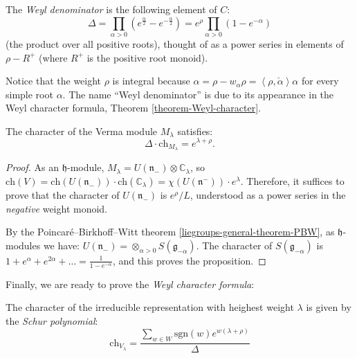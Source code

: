 \begin{definition}
 \label{definition-Weyl-denominator}
The {\it Weyl denominator} is the following element of $C$: 
$$\Delta = \prod_{\alpha>0} \left( e^\frac{\alpha}{2} - e^{-\frac{\alpha}{2}}\right) =  e^\rho \prod_{\alpha>0} \left( 1 - e^{-{\alpha}}\right)$$
(the product over all positive roots), thought of as a power series in elements of $\rho-R^+$ (where $R^+$ is the positive root monoid).
\end{definition}

Notice that the weight $\rho$ is integral because $\alpha = \rho- w_\alpha\rho = \left< \rho,\check\alpha\right> \alpha$ for every simple root $\alpha$. The name ``Weyl denominator'' is due to its appearance in the Weyl character formula, Theorem \ref{theorem-Weyl-character}.


\begin{proposition}
\label{proposition-character-Verma}
 The character of the Verma module $M_\lambda$ satisfies:
$$ \Delta \cdot \text{ch}_{M_\lambda} = e^{\lambda+\rho}.$$
\end{proposition}

\begin{proof}
 As an $\mathfrak h$-module, $M_\lambda = U(\mathfrak n_-) \otimes \mathbb C_\lambda$, so $\text{ch}(V) = \text{ch}(U(\mathfrak n_-))\cdot \text{ch}(\mathbb C_{\lambda}) = \chi(U(\mathfrak n^-))\cdot e^{\lambda}$. Therefore, it suffices to prove that the character of $U(\mathfrak n_-)$ is $e^\rho/L$, understood as a power series in the \emph{negative} weight monoid.

 By the Poincar\'e--Birkhoff--Witt theorem \ref{liegroups-general-theorem-PBW}, as $\mathfrak h$-modules we have: $U(\mathfrak n_-) = \otimes_{\alpha>0} S(\mathfrak g_{-\alpha})$. The character of $S(\mathfrak g_{-\alpha})$ is $1+e^{\alpha}+e^{2\alpha}+\dots = \frac{1}{1-e^{-\alpha}}$, and this proves the proposition.
\end{proof}

Finally, we are ready to prove the \emph{Weyl character formula}:

\begin{theorem}
\label{theorem-Weyl-character}
The character of the irreducible representation with heighest weight $\lambda$ is given by the \emph{Schur polynomial}:
$$ \text{ch}_{V_\lambda} = \frac{\sum_{w\in W} \text{sgn}(w) e^{w(\lambda+\rho)}}{\Delta}$$
\end{theorem}

